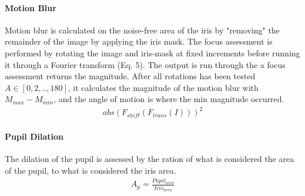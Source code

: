 \paragraph{Motion Blur}
Motion blur is calculated on the noise-free area of the iris by "removing" the 
remainder of the image by applying the iris mask.  The focus assessment is
performed by rotating the image and iris-mask at fixed increments before running
it through a Fourier transform (Eq. 5). The output is run through the a focus
assessment returns the magnitude. After all rotations has been tested $A\in
[0,2,..,180]$, it calculates the magnitude of the motion blur with
$M_{max}-M_{min}$, and the angle of motion is where the min magnitude occurred.
\vspace{-3mm}
\begin{align}
abs( F_{shift}( F_{trans}( I ) ) )^2 
\end{align}



\paragraph{Pupil Dilation}
The dilation of the pupil is assessed by the ration of what is considered the
area of the pupil, to what is considered the iris area.
\vspace{-3mm}
\begin{align}
A_p = \frac{Pupil_{area}}{Iris_{area}} 
\end{align}


